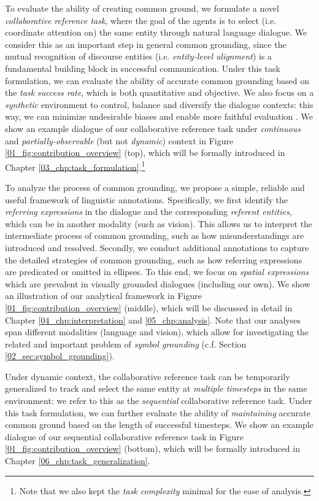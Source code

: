 To evaluate the ability of creating common ground, we formulate a novel \textit{collaborative reference task}, where the goal of the agents is to select (i.e. coordinate attention on) the same entity through natural language dialogue. We consider this as an important step in general common grounding, since the mutual recognition of discourse entities (i.e. \textit{entity-level alignment}) is a fundamental building block in successful communication. Under this task formulation, we can evaluate the ability of accurate common grounding based on the \textit{task success rate}, which is both quantitative and objective. We also focus on a \textit{synthetic} environment to control, balance and diversify the dialogue contexts: this way, we can minimize undesirable biases and enable more faithful evaluation \citep{johnson2017clevr,girdhar2020cater}. We show an example dialogue of our collaborative reference task under \textit{continuous} and \textit{partially-observable} (but not \textit{dynamic}) context in Figure \ref{01_fig:contribution_overview} (top), which will be formally introduced in Chapter \ref{03_chp:task_formulation}.\footnote{Note that we also kept the \textit{task complexity} minimal for the ease of analysis.}

To analyze the process of common grounding, we propose a simple, reliable and useful framework of linguistic annotations. Specifically, we first identify the \textit{referring expressions} in the dialogue and the corresponding \textit{referent entities}, which can be in another modality (such as vision). This allows us to interpret the intermediate process of common grounding, such as how misunderstandings are introduced and resolved. Secondly, we conduct additional annotations to capture the detailed strategies of common grounding, such as how referring expressions are predicated or omitted in ellipses. To this end, we focus on \textit{spatial expressions} which are prevalent in visually grounded dialogues (including our own). We show an illustration of our analytical framework in Figure \ref{01_fig:contribution_overview} (middle), which will be discussed in detail in Chapter \ref{04_chp:interpretation} and \ref{05_chp:analysis}. Note that our analyses span different modalities (language and vision), which allow for investigating the related and important problem of \textit{symbol grounding} (c.f. Section \ref{02_sec:symbol_grounding}).

Under dynamic context, the collaborative reference task can be temporarily generalized to track and select the same entity at \textit{multiple timesteps} in the same environment: we refer to this as the \textit{sequential} collaborative reference task. Under this task formulation, we can further evaluate the ability of \textit{maintaining} accurate common ground based on the length of successful timesteps. We show an example dialogue of our sequential collaborative reference task in Figure \ref{01_fig:contribution_overview} (bottom), which will be formally introduced in Chapter \ref{06_chp:task_generalization}.

